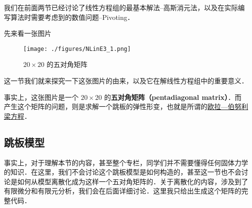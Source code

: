 
\begin{issues}
\issueDraft
\end{issues}


我们在前面两节已经讨论了线性方程组的最基本解法--高斯消元法，以及在实际编写算法时需要考虑到的数值问题--Pivoting．

先来看一张图片
\begin{figure}[ht]
\centering
\texttt{[image: ./figures/NLinE3\_1.png]}
\caption{$20\times 20$ 的五对角矩阵} \label{NLinE3_fig1}
\end{figure}
这一节我们就来探究一下这张图片的由来，以及它在解线性方程组中的重要意义．

事实上，这张图片是一个 $20\times20$  的\textbf{五对角矩阵（pentadiagonal matrix）}．而产生这个矩阵的问题，则是求解一个跳板的弹性形变，也就是所谓的\href{https://en.wikipedia.org/wiki/Euler%E2%80%93Bernoulli_beam_theory}{欧拉—伯努利梁方程}．

\subsection{跳板模型}

事实上，对于理解本节的内容，甚至整个专栏，同学们并不需要懂得任何固体力学的知识．在这里，我们不会讨论这个跳板模型是如何构造的，甚至这一节也不会讨论是如何从模型离散化成为这样一个五对角矩阵的．关于离散化的内容，涉及到了有限微分和有限元分析，我们会在后面详细讨论．这里我只给出生成这个矩阵的完整代码．

